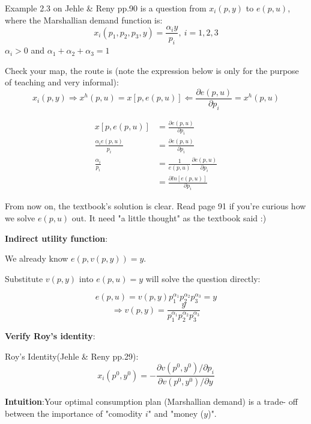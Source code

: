 \documentclass{article}
\begin{document}
\vspace{3mm}

\begin{mdframed}[backgroundcolor=blue!20,linecolor=white]
Example 2.3 on Jehle \& Reny pp.90 is a question from $x_i(p,y)$ to $e(p,u)$, where the Marshallian demand function is:
$$x_i(p_1,p_2,p_3,y) = \frac{\alpha_i y}{p_i} , \ i=1,2,3$$
 $\alpha_i >0$ and $\alpha_1+\alpha_2+\alpha_3 = 1$

Check your map, the route is (note the expression below is only for the purpose of teaching and very informal):
$$x_i(p,y) \Rightarrow x^h(p,u) = x[p,e(p,u)] \Leftarrow \frac{\partial e(p,u)}{\partial p_i} = x^h(p,u)$$

\begin{align*}
x[p,e(p,u)] &=  \frac{\partial e(p,u)}{\partial p_i} \\
\frac{\alpha_i e(p,u)}{p_i} &=  \frac{\partial e(p,u)}{\partial p_i} \\
\frac{\alpha_i }{p_i} &=  \frac{1}{e(p,u)}\frac{\partial e(p,u)}{\partial p_i} \\
&=  \frac{\partial ln[e(p,u)]}{\partial p_i}
\end{align*}

From now on, the textbook's solution is clear. Read page 91 if you're curious how we solve $e(p,u)$ out. It need "a little thought" as the textbook said :)

\end{mdframed}


\textbf{Indirect utility function}:

We already know $e(p, v(p, y)) = y$.

Substitute $v(p, y)$ into $e(p, u) = y$ will solve the question directly:

$$e(p, u) = v(p, y) p_1^{\alpha_1}p_2^{\alpha_2}p_3^{\alpha_3} = y$$
$$\Rightarrow v(p, y) = \frac{y}{p_1^{\alpha_1}p_2^{\alpha_2}p_3^{\alpha_3}}$$

\textbf{Verify Roy's identity}:

\begin{mdframed}[backgroundcolor=blue!20,linecolor=white]
Roy's Identity(Jehle \& Reny pp.29): $$x_i(p^0,y^0) = - \frac{\partial v(p^0,y^0) / \partial p_i}{\partial v(p^0,y^0) / \partial y}$$

\textbf{Intuition}:Your optimal consumption plan (Marshallian demand) is a trade- off between the importance of "comodity $i$" and "money ($y$)".

\end{mdframed}
\end{document}

